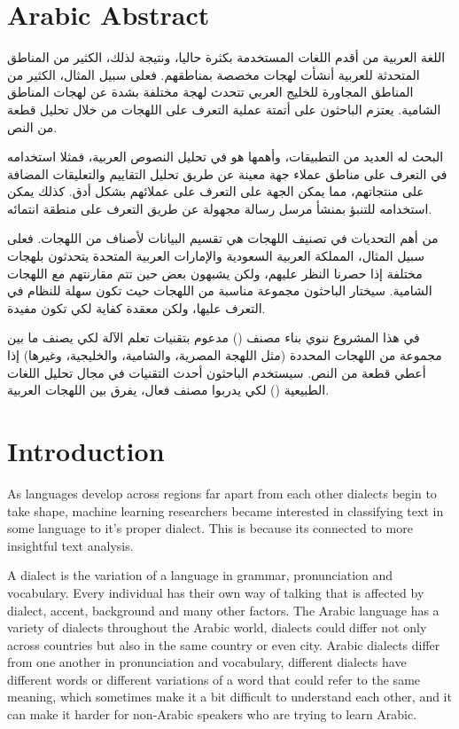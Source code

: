 \documentclass[12pt]{diazessay}
\begin{document}
\section*{Arabic Abstract}
\begin{RLtext}
اللغة العربية من أقدم اللغات المستخدمة بكثرة حاليا، ونتيجة لذلك، الكثير من المناطق المتحدثة للعربية أنشأت لهجات مخصصة بمناطقهم. فعلى سبيل المثال، الكثير من المناطق المجاورة للخليج العربي تتحدث لهجة مختلفة بشدة عن لهجات المناطق الشامية. يعتزم الباحثون على أتمتة عملية التعرف على اللهجات من خلال تحليل قطعة من النص.

البحث له العديد من التطبيقات، وأهمها هو في تحليل النصوص العربية، فمثلا استخدامه في التعرف على مناطق عملاء جهة معينة عن طريق تحليل التقاييم والتعليقات المضافة على منتجاتهم، مما يمكن الجهة على التعرف على عملائهم بشكل أدق. كذلك يمكن استخدامه للتنبؤ بمنشأ مرسل رسالة مجهولة عن طريق التعرف على منطقة انتمائه.

من أهم التحديات في تصنيف اللهجات هي تقسيم البيانات لأصناف من اللهجات. فعلى سبيل المثال، المملكة العربية السعودية والإمارات العربية المتحدة يتحدثون بلهجات مختلفة إذا حصرنا النظر عليهم، ولكن يشبهون بعض حين تتم مقارنتهم مع اللهجات الشامية. سيختار الباحثون مجموعة مناسبة من اللهجات حيث تكون سهلة للنظام في التعرف عليها، ولكن معقدة كفاية لكي تكون مفيدة.

في هذا المشروع ننوي بناء مصنف () مدعوم بتقنيات تعلم الآلة لكي يصنف ما بين مجموعة من اللهجات المحددة (مثل اللهجة المصرية، والشامية، والخليجية، وغيرها) إذا أعطي قطعة من النص. سيستخدم الباحثون أحدث التقنيات في مجال تحليل اللغات الطبيعية () لكي يدربوا مصنف فعال، يفرق بين اللهجات العربية.
\end{RLtext}


\section{Introduction}
    As languages develop across regions far apart from each other dialects begin to take shape, machine learning researchers became interested in classifying text in some language to it's proper dialect. This is because its connected to more insightful text analysis.
    
    A dialect is the variation of a language in grammar, pronunciation and vocabulary. Every individual has their own way of talking that is affected by dialect, accent, background and many other factors\cite{10.5555/2126240}. The Arabic language has a variety of dialects throughout the Arabic world, dialects could differ not only across countries but also in the same country or even city. Arabic dialects differ from one another in pronunciation and vocabulary, different dialects have different words or different variations of a word that could refer to the same meaning, which sometimes make it a bit difficult to understand each other, and it can make it harder for non-Arabic speakers who are trying to learn Arabic.
    
\end{document}
